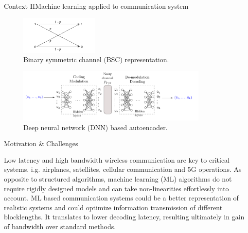 \documentclass{beamer}
\begin{document}
\begin{frame}{Context II}{Machine learning applied to communication system}


  \begin{figure}
  \centering
   \includegraphics[width=0.35\textwidth]{images/BSC}
  \caption{Binary symmetric channel (BSC) representation.}%
\end{figure}


  \begin{figure}
  \centering
   \includegraphics[width=0.85\textwidth]{images/autoencoder}
  \caption{Deep neural network (DNN) based autoencoder.}%
\end{figure}

\end{frame}

\begin{frame}{Motivation \& Challenges}

\begin{outline}
 \1 Low latency and high bandwidth wireless communication are key to critical systems.
   \2 i.g. airplanes, satellites, cellular communication and 5G operations.
\pause
 \1 As opposite to structured algorithms, machine learning (ML) algorithms do not require rigidly designed models and can take non-linearities effortlessly into account.
\pause
 \1  ML based communication systems could be a better representation of realistic systems and could optimize information transmission of different blocklengths.
   \2 It translates to lower decoding latency, resulting ultimately in gain of bandwidth over standard methods.
  
\end{outline} 
  
\end{frame}
\end{document}
